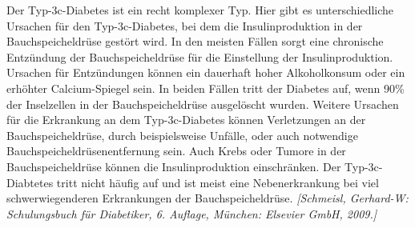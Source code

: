 \documentclass[a4paper,11pt]{article}%
\renewcommand{\\}{\vspace*{0.5\baselineskip} \newline}
\begin{document}
	Der Typ-3c-Diabetes ist ein recht komplexer Typ. Hier gibt es unterschiedliche Ursachen für den Typ-3c-Diabetes, bei dem die Insulinproduktion in der Bauchspeicheldrüse gestört wird. In den meisten Fällen sorgt eine chronische Entzündung der Bauchspeicheldrüse für die Einstellung der Insulinproduktion. Ursachen für Entzündungen können ein dauerhaft hoher Alkoholkonsum oder ein erhöhter Calcium-Spiegel sein. In beiden Fällen tritt der Diabetes auf, wenn 90\% der Inselzellen in der Bauchspeicheldrüse ausgelöscht wurden.\newline
	Weitere Ursachen für die Erkrankung an dem Typ-3c-Diabetes können Verletzungen an der Bauchspeicheldrüse, durch beispielsweise Unfälle, oder auch notwendige Bauchspeicheldrüsenentfernung sein. Auch Krebs oder Tumore in der Bauchspeicheldrüse können die Insulinproduktion einschränken. Der Typ-3c-Diabtetes tritt nicht häufig auf und ist meist eine Nebenerkrankung bei viel schwerwiegenderen Erkrankungen der Bauchspeicheldrüse. \emph{[Schmeisl, Gerhard-W: Schulungsbuch für Diabetiker, 6. Auflage, München: Elsevier GmbH, 2009.]} 
\end{document}
